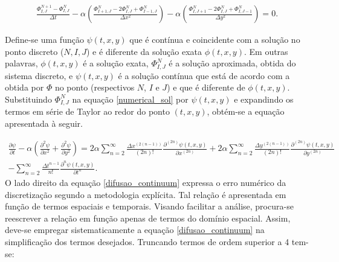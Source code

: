 \documentclass[a0,portrait]{a0poster}
\begin{document}
\begin{minipage}[c]{\linewidth}
\begin{framed}
\begin{multicols}{2}
\begin{equation} \label{numerical_sol}
\begin{split}
\frac{\Phi_{I,J}^{N+1}-\Phi_{I,J}^{N} }{\Delta t} - \alpha \left( \frac{\Phi_{I+1,J}^{N} -2 \Phi_{I,J}^{N} + \Phi_{I-1,J}^{N}}{\Delta x^2} \right) -	\alpha \left( \frac{\Phi_{I,J+1}^{N}-2 \Phi_{I,J}^{N} + \Phi_{I,J-1}^{N}}{\Delta y^2} \right) = 0. %
\end{split}
\end{equation}

 Define-se uma função $\psi(t,x,y)$ que é contínua e coincidente com a solução no ponto discreto ($N,I,J$) e é diferente da solução exata $\phi(t,x,y)$. Em outras palavras, $\phi(t,x,y)$ é a solução exata, $\Phi_{I,J}^{N}$ é a solução aproximada, obtida do sistema discreto, e $\psi(t,x,y)$ é a solução contínua que está de acordo com a obtida por $\Phi$ no ponto (respectivos $N$, $I$ e $J$) e que é diferente de $\phi(t,x,y)$. Substituindo $\Phi_{I,J}^{N}$ na equação \ref{numerical_sol} por $\psi(t,x,y)$ e expandindo os termos em série de Taylor ao redor do ponto $(t,x,y)$, obtém-se a equação apresentada à seguir.	

\begin{equation} \label{difusao_continuum}
\begin{split}
\frac{\partial \psi}{\partial t} - \alpha \left( \frac{\partial^{2} \psi}{\partial x^{2}} + \frac{\partial^{2} \psi}{\partial y^{2}} \right) = 2 \alpha \sum\limits_{n=2}^{\infty} \frac{ \Delta x^{\left(2\left(n-1\right)\right)}}{\left(2n\right)!} \frac{\partial^{\left(2n\right)} \psi \left(t, x, y\right)}{\partial x^{\left(2n\right)}} + 2 \alpha \sum\limits_{n=2}^{\infty} \frac{ \Delta y^{\left(2\left(n-1\right)\right)}}{\left(2n\right)!} \frac{\partial^{\left(2n\right)} \psi \left(t, x, y\right)}{\partial y^{\left(2n\right)}} \\ - \sum\limits_{n=2}^{\infty} \frac{\Delta t^{n-1}}{n!} \frac{\partial^{n} \psi\left(t, x, y\right)}{\partial t^{n}}. %
\end{split}
\end{equation}
O lado direito da equação \ref{difusao_continuum} expressa o erro numérico da discretização segundo a metodologia explícita. Tal relação é apresentada em função de termos espaciais e temporais. Visando facilitar a análise, procura-se reescrever a relação em função apenas de termos do domínio espacial. Assim, deve-se empregar sistematicamente a equação \ref{difusao_continuum} na simplificação dos termos desejados. Truncando termos de ordem superior a 4 tem-se:


\end{multicols}
\end{framed}
\end{minipage}
\end{document}
